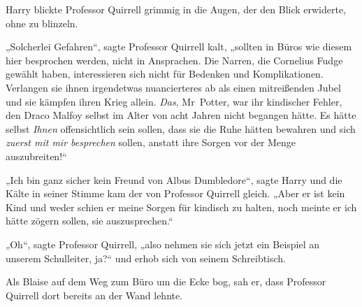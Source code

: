 Harry blickte Professor Quirrell grimmig in die Augen, der den Blick erwiderte, ohne zu blinzeln.

„Solcherlei Gefahren“, sagte Professor Quirrell kalt, „sollten in Büros wie diesem hier besprochen werden, nicht in Ansprachen. Die Narren, die Cornelius Fudge gewählt haben, interessieren sich nicht für Bedenken und Komplikationen. Verlangen sie ihnen irgendetwas nuancierteres ab als einen mitreißenden Jubel und sie kämpfen ihren Krieg allein. \emph{Das}, Mr~Potter, war ihr kindischer Fehler, den Draco Malfoy selbst im Alter von acht Jahren nicht begangen hätte. Es hätte selbst \emph{Ihnen} offensichtlich sein sollen, dass sie die Ruhe hätten bewahren und sich \emph{zuerst mit mir besprechen} sollen, anstatt ihre Sorgen vor der Menge auszubreiten!“

„Ich bin ganz sicher kein Freund von Albus Dumbledore“, sagte Harry und die Kälte in seiner Stimme kam der von Professor Quirrell gleich.
„Aber er ist kein Kind und weder schien er meine Sorgen für kindisch zu halten, noch meinte er ich hätte zögern sollen, sie auszusprechen.“

„Oh“, sagte Professor Quirrell, „also nehmen sie sich jetzt ein Beispiel an unserem Schulleiter, ja?“ und erhob sich von seinem Schreibtisch.

\later

Als Blaise auf dem Weg zum Büro um die Ecke bog, sah er, dass Professor Quirrell dort bereits an der Wand lehnte.


